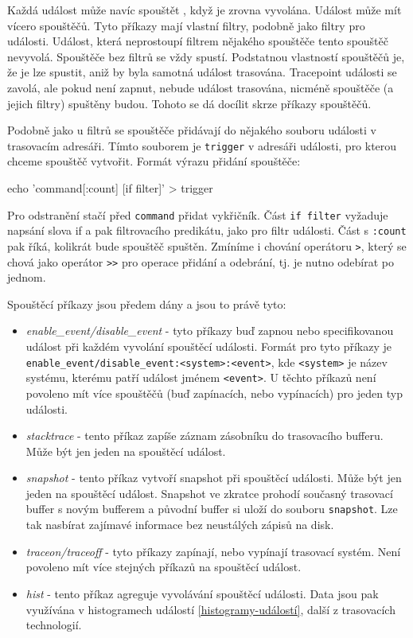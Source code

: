 Každá událost může navíc spouštět , když je zrovna vyvolána. Událost může mít vícero spouštěčů. Tyto příkazy mají vlastní filtry, podobně jako filtry pro události. Událost, která neprostoupí filtrem nějakého spouštěče tento spouštěč nevyvolá. Spouštěče bez filtrů se vždy spustí. Podstatnou vlastností spouštěčů je, že je lze spustit, aniž by byla samotná událost trasována. Tracepoint události se zavolá, ale pokud není zapnut, nebude událost trasována, nicméně spouštěče (a jejich filtry) spuštěny budou. Tohoto  se dá docílit skrze příkazy spouštěčů.

Podobně jako u filtrů se spouštěče přidávají do nějakého souboru události v trasovacím adresáři. Tímto souborem je \texttt{trigger} v adresáři události, pro kterou chceme spouštěč vytvořit. Formát výrazu přidání spouštěče:
\begin{code}
    echo 'command[:count] [if filter]' > trigger
\end{code}
Pro odstranění stačí před \texttt{command} přidat vykřičník. Část \texttt{if filter} vyžaduje napsání slova if a pak filtrovacího predikátu, jako pro filtr události. Část s \texttt{:count} pak říká, kolikrát bude spouštěč spuštěn. Zmíníme i chování operátoru \texttt{>}, který se chová jako operátor \texttt{>>} pro operace přidání a odebrání, tj. je nutno odebírat po jednom.

Spouštěcí příkazy jsou předem dány a jsou to právě tyto:
\begin{itemize}
    \item \emph{enable\_event/disable\_event} - tyto příkazy buď zapnou nebo  specifikovanou událost při každém vyvolání spouštěcí události. Formát pro tyto příkazy je \texttt{enable\_event/disable\_event:<system>:<event>}, kde \texttt{<system>} je název systému, kterému patří událost jménem \texttt{<event>}. U těchto příkazů není povoleno mít více spouštěčů (buď zapínacích, nebo vypínacích) pro jeden typ události.
    \item \emph{stacktrace} - tento příkaz zapíše záznam zásobníku do trasovacího bufferu. Může být jen jeden na spouštěcí událost.
    \item \emph{snapshot} - tento příkaz vytvoří snapshot při spouštěcí události. Může být jen jeden na spouštěcí událost. Snapshot ve zkratce prohodí současný trasovací buffer s novým bufferem a původní buffer si uloží do souboru \texttt{snapshot}. Lze tak nasbírat zajímavé informace bez neustálých zápisů na disk. 
    \item \emph{traceon/traceoff} - tyto příkazy zapínají, nebo vypínají trasovací systém. Není povoleno mít více stejných příkazů na spouštěcí událost.
    \item \emph{hist} - tento příkaz agreguje vyvolávání spouštěcí události. Data jsou pak využívána v histogramech událostí \ref{histogramy-událostí}, další z trasovacích technologií.
\end{itemize}

